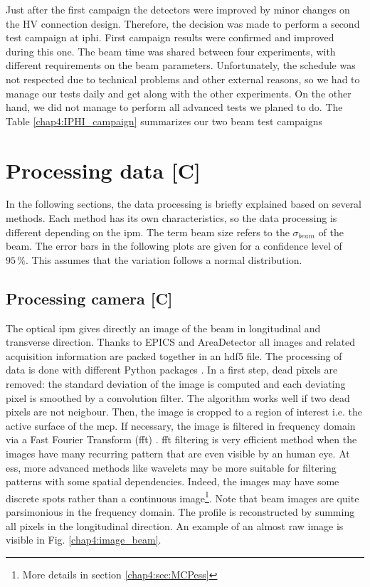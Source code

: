 \begin{refsection}
  

  Just after the first campaign the detectors were improved by minor changes on the HV connection design. Therefore, the decision was made to perform a second test campaign at \acrshort{iphi}.
  First campaign results were confirmed and improved during this one.
  The beam time was shared between four experiments, with different requirements on the beam parameters.
  Unfortunately, the schedule was not respected due to technical problems and other external reasons, so
  we had to manage our tests daily and get along with the other experiments.
  On the other hand, we did not manage to perform all advanced tests we planed to do.
  The Table \ref{chap4:IPHI_campaign} summarizes our two beam test campaigns

  


  \section{Processing data [C]}
  In the following sections, the data processing is briefly explained based on several methods. Each method has its own characteristics, so the data processing is different depending on the \acrshort{ipm}. The term beam size refers to the $\sigma_{beam}$ of the beam. The error bars in the following plots are given for a confidence level of $95\,\mathrm{\%}$. This assumes that the variation follows a normal distribution.

  \subsection{Processing camera [C]}
  The optical \acrshort{ipm} gives directly an image of the beam in longitudinal and transverse direction. Thanks to EPICS and AreaDetector all images and related acquisition information are packed together in an \acrshort{hdf}5 file. The processing of data is done with different Python packages \cite{NumPy2011,SciPy2019,Hunter2007}. In a first step, dead pixels are removed: the standard deviation of the image is computed and each deviating pixel is smoothed by a convolution filter. The algorithm works well if two dead pixels are not neigbour. Then, the image is cropped to a region of interest i.e. the active surface of the \acrshort{mcp}. If necessary, the image is filtered in frequency domain via a Fast Fourier Transform (\acrshort{fft}) \cite{Burrus2012}. \acrshort{fft} filtering is very efficient method when the images have many recurring pattern that are even visible by an human eye. At \acrshort{ess}, more advanced methods like wavelets \cite{Burrus1997,bultheel2014} may be more suitable for filtering patterns with some spatial dependencies. Indeed, the images may have some discrete spots rather than a continuous image\footnote{More details in section \ref{chap4:sec:MCPess}}. Note that beam images are quite parsimonious in the frequency domain. The profile is reconstructed by summing all pixels in the longitudinal direction. An example of an almost raw image is visible in Fig. \ref{chap4:image_beam}.


\end{refsection}
